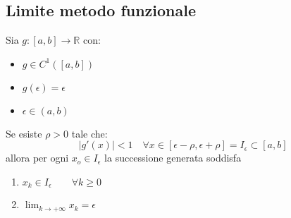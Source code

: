\subsection{Limite metodo funzionale}
\begin{theorem}
	Sia $g:[a,b]\to \mathbb{R}$ con:
	\begin{itemize}
		\item $g \in C^1([a,b])$
		\item $g(\epsilon) = \epsilon$
		\item $\epsilon \in (a,b)$
	\end{itemize}
	Se esiste $\rho > 0$ tale che:
	\begin{equation*}
		\lvert g'(x) \rvert < 1 \quad \forall x \in [\epsilon - \rho, \epsilon + \rho] = I_{\epsilon} \subset [a,b]
	\end{equation*}
	allora per ogni $x_o \in I_\epsilon$ la successione generata soddisfa
	\begin{enumerate}
		\item $x_k \in I_\epsilon \quad\quad \forall k \geq 0$
		\item $\lim_{k \to +\infty} x_k = \epsilon$
	\end{enumerate}
\end{theorem}
